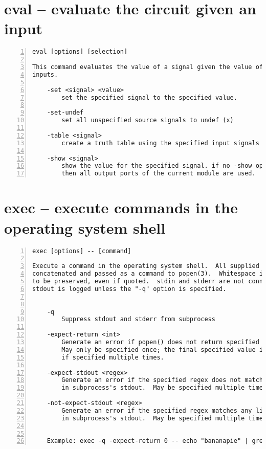 \section{eval -- evaluate the circuit given an input}
\label{cmd:eval}
\begin{lstlisting}[numbers=left,frame=single]
    eval [options] [selection]

This command evaluates the value of a signal given the value of all required
inputs.

    -set <signal> <value>
        set the specified signal to the specified value.

    -set-undef
        set all unspecified source signals to undef (x)

    -table <signal>
        create a truth table using the specified input signals

    -show <signal>
        show the value for the specified signal. if no -show option is passed
        then all output ports of the current module are used.
\end{lstlisting}

\section{exec -- execute commands in the operating system shell}
\label{cmd:exec}
\begin{lstlisting}[numbers=left,frame=single]
    exec [options] -- [command]

Execute a command in the operating system shell.  All supplied arguments are
concatenated and passed as a command to popen(3).  Whitespace is not guaranteed
to be preserved, even if quoted.  stdin and stderr are not connected, while
stdout is logged unless the "-q" option is specified.


    -q
        Suppress stdout and stderr from subprocess

    -expect-return <int>
        Generate an error if popen() does not return specified value.
        May only be specified once; the final specified value is controlling
        if specified multiple times.

    -expect-stdout <regex>
        Generate an error if the specified regex does not match any line
        in subprocess's stdout.  May be specified multiple times.

    -not-expect-stdout <regex>
        Generate an error if the specified regex matches any line
        in subprocess's stdout.  May be specified multiple times.


    Example: exec -q -expect-return 0 -- echo "bananapie" | grep "nana"
\end{lstlisting}

